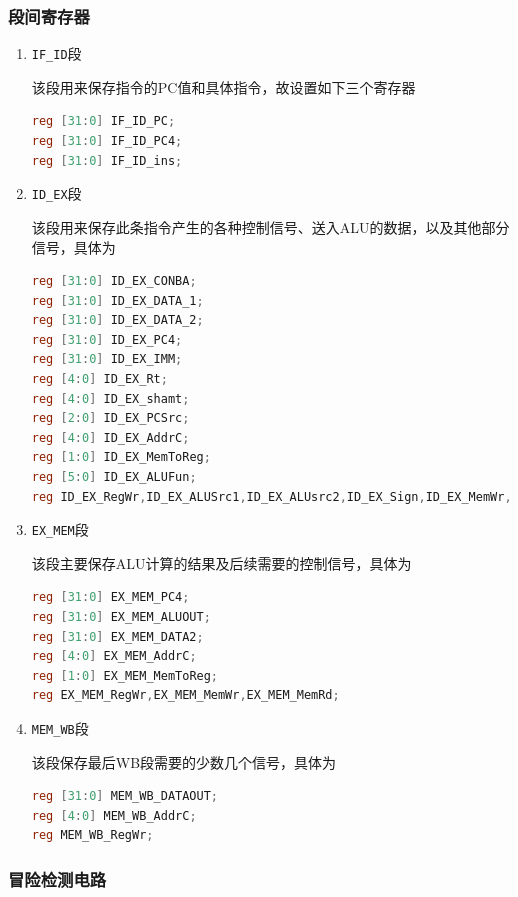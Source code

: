 \documentclass{ctexart}
\begin{document}
		\subsubsection{段间寄存器}

		\begin{enumerate}
			\item \verb"IF_ID"段

			该段用来保存指令的PC值和具体指令，故设置如下三个寄存器

\begin{lstlisting}[language = verilog]
reg [31:0] IF_ID_PC;
reg [31:0] IF_ID_PC4;
reg [31:0] IF_ID_ins;
\end{lstlisting}

			\item \verb"ID_EX"段
			
			该段用来保存此条指令产生的各种控制信号、送入ALU的数据，以及其他部分信号，具体为

\begin{lstlisting}[language = verilog]
reg [31:0] ID_EX_CONBA;
reg [31:0] ID_EX_DATA_1;
reg [31:0] ID_EX_DATA_2;
reg [31:0] ID_EX_PC4;
reg [31:0] ID_EX_IMM;
reg [4:0] ID_EX_Rt;
reg [4:0] ID_EX_shamt;
reg [2:0] ID_EX_PCSrc;
reg [4:0] ID_EX_AddrC;
reg [1:0] ID_EX_MemToReg;
reg [5:0] ID_EX_ALUFun;
reg ID_EX_RegWr,ID_EX_ALUSrc1,ID_EX_ALUsrc2,ID_EX_Sign,ID_EX_MemWr,ID_EX_MemRd;
\end{lstlisting}

			\item \verb"EX_MEM"段

			该段主要保存ALU计算的结果及后续需要的控制信号，具体为			

\begin{lstlisting}[language = verilog]
reg [31:0] EX_MEM_PC4;
reg [31:0] EX_MEM_ALUOUT;
reg [31:0] EX_MEM_DATA2;
reg [4:0] EX_MEM_AddrC;
reg [1:0] EX_MEM_MemToReg;
reg EX_MEM_RegWr,EX_MEM_MemWr,EX_MEM_MemRd;
\end{lstlisting}

			\item \verb"MEM_WB"段

			该段保存最后WB段需要的少数几个信号，具体为

\begin{lstlisting}[language = verilog]
reg [31:0] MEM_WB_DATAOUT;
reg [4:0] MEM_WB_AddrC;
reg MEM_WB_RegWr;
\end{lstlisting}
			
			\end{enumerate}

			\subsubsection{冒险检测电路}
\end{document}
